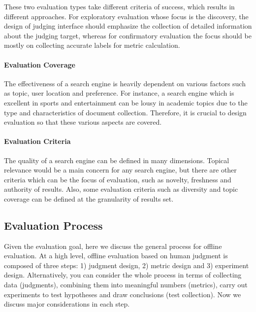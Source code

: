 These two evaluation types take different criteria of success, which results in different approaches. For exploratory evaluation whose focus is the discovery, the design of judging interface should emphasize the collection of detailed information about the judging target, whereas for confirmatory evaluation the focus should be mostly on collecting accurate labels for metric calculation. 

\paragraph{Evaluation Coverage}
The effectiveness of a search engine is heavily dependent on various factors such as topic, user location and preference. For instance, a search engine which is excellent in sports and entertainment can be lousy in academic topics due to the type and characteristics of document collection. Therefore, it is crucial to design evaluation so that these various aspects are covered. 

\paragraph{Evaluation Criteria}
The quality of a search engine can be defined in many dimensions. Topical relevance would be a main concern for any search engine, but there are other criteria which can be the focus of evaluation, such as novelty, freshness and authority of results. Also, some evaluation criteria such as diversity and topic coverage can be defined at the granularity of results set.

\subsection{Evaluation Process}
Given the evaluation goal, here we discuss the general process for offline evaluation. At a high level, offline evaluation based on human judgment is composed of three steps: 1) judgment design, 2) metric design and 3) experiment design. Alternatively, you can consider the whole process in terms of collecting data (judgments), combining them into meaningful numbers (metrics), carry out experiments to test hypotheses and draw conclusions (test collection). Now we discuss major considerations in each step.


